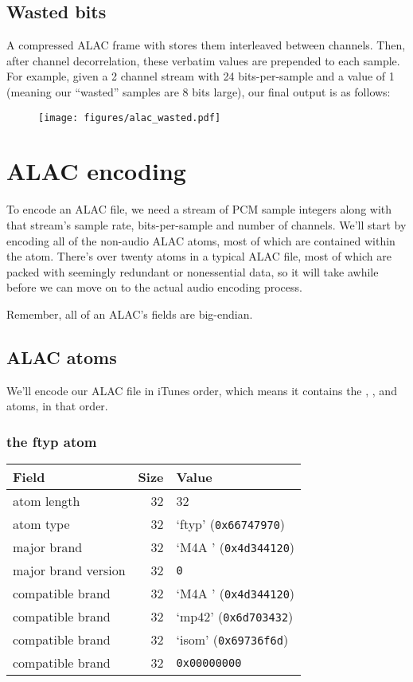 \subsection{Wasted bits}
\label{alac_wasted_bits}
A compressed ALAC frame
with  stores them interleaved between channels.
Then, after channel decorrelation, these verbatim values are
prepended to each sample.
For example, given a 2 channel stream with 24 bits-per-sample and
a  value of 1 (meaning our ``wasted'' samples
are 8 bits large), our final output is as follows:
\begin{figure}[h]
\texttt{[image: figures/alac\_wasted.pdf]}
\end{figure}

\clearpage

\section{ALAC encoding}

To encode an ALAC file, we need a stream of PCM sample integers
along with that stream's sample rate, bits-per-sample and number of
channels.
We'll start by encoding all of the non-audio ALAC atoms,
most of which are contained within the  atom.
There's over twenty atoms in a typical ALAC file,
most of which are packed with seemingly redundant or
nonessential data,
so it will take awhile before we can move on to the actual
audio encoding process.

Remember, all of an ALAC's fields are big-endian.

\subsection{ALAC atoms}

We'll encode our ALAC file in iTunes order, which means
it contains the , ,  and
 atoms, in that order.

\subsubsection{the ftyp atom}

\begin{table}[h]
\begin{tabular}{|l|r|l|}
\hline
Field & Size & Value \\
\hline
atom length & 32 & 32 \\
atom type & 32 & `ftyp' (\texttt{0x66747970}) \\
\hline
major brand & 32 & `M4A ' (\texttt{0x4d344120}) \\
major brand version & 32 & \texttt{0} \\
compatible brand & 32 & `M4A ' (\texttt{0x4d344120}) \\
compatible brand & 32 & `mp42' (\texttt{0x6d703432}) \\
compatible brand & 32 & `isom' (\texttt{0x69736f6d}) \\
compatible brand & 32 & \texttt{0x00000000} \\
\hline
\end{tabular}
\end{table}

